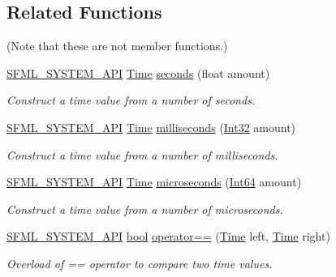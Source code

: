 \subsection*{Related Functions}
(Note that these are not member functions.) \begin{DoxyCompactItemize}
\item 
\hyperlink{sfml_2dep_2_s_f_m_l-2_84_82_2include_2_s_f_m_l_2_system_2_export_8hpp_a6476c9e422606477a4c23d92b1d79a1f}{S\-F\-M\-L\-\_\-\-S\-Y\-S\-T\-E\-M\-\_\-\-A\-P\-I} \hyperlink{classsf_1_1_time}{Time} \hyperlink{classsf_1_1_time_ae36b9ef700f0ed0516abf0194ceb546b}{seconds} (float amount)
\begin{DoxyCompactList}\small\item\em Construct a time value from a number of seconds. \end{DoxyCompactList}\item 
\hyperlink{sfml_2dep_2_s_f_m_l-2_84_82_2include_2_s_f_m_l_2_system_2_export_8hpp_a6476c9e422606477a4c23d92b1d79a1f}{S\-F\-M\-L\-\_\-\-S\-Y\-S\-T\-E\-M\-\_\-\-A\-P\-I} \hyperlink{classsf_1_1_time}{Time} \hyperlink{classsf_1_1_time_ae379d420bc07170668f51522023957b9}{milliseconds} (\hyperlink{namespacesf_ac2dfd4952377a26dee4750e2e4a30a15}{Int32} amount)
\begin{DoxyCompactList}\small\item\em Construct a time value from a number of milliseconds. \end{DoxyCompactList}\item 
\hyperlink{sfml_2dep_2_s_f_m_l-2_84_82_2include_2_s_f_m_l_2_system_2_export_8hpp_a6476c9e422606477a4c23d92b1d79a1f}{S\-F\-M\-L\-\_\-\-S\-Y\-S\-T\-E\-M\-\_\-\-A\-P\-I} \hyperlink{classsf_1_1_time}{Time} \hyperlink{classsf_1_1_time_a951fd7219641f1e8191887f5dfe0dc31}{microseconds} (\hyperlink{namespacesf_a2840579fed3494d9f330baf7a5a19903}{Int64} amount)
\begin{DoxyCompactList}\small\item\em Construct a time value from a number of microseconds. \end{DoxyCompactList}\item 
\hyperlink{sfml_2dep_2_s_f_m_l-2_84_82_2include_2_s_f_m_l_2_system_2_export_8hpp_a6476c9e422606477a4c23d92b1d79a1f}{S\-F\-M\-L\-\_\-\-S\-Y\-S\-T\-E\-M\-\_\-\-A\-P\-I} \hyperlink{term__entry_8h_a002004ba5d663f149f6c38064926abac}{bool} \hyperlink{classsf_1_1_time_a2b8453227f651e9d5db3663fa08c47e2}{operator==} (\hyperlink{classsf_1_1_time}{Time} left, \hyperlink{classsf_1_1_time}{Time} right)
\begin{DoxyCompactList}\small\item\em Overload of == operator to compare two time values. \end{DoxyCompactList}\item 

\end{DoxyCompactItemize}
